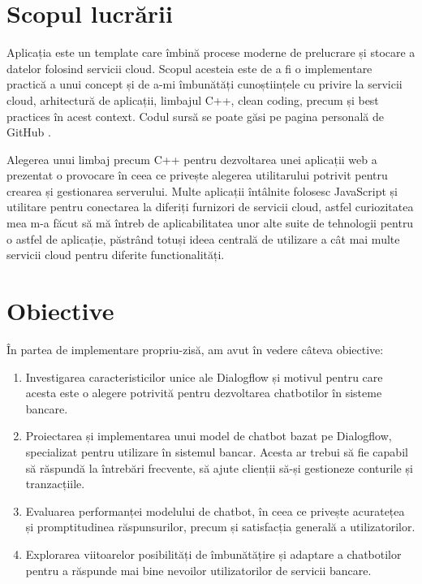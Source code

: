 \section{Scopul lucrării}

Aplicația este un template care îmbină procese moderne de prelucrare și stocare a datelor folosind servicii cloud. Scopul acesteia este de a fi o implementare practică a unui concept și de a-mi îmbunătăți cunoștiințele cu privire la servicii cloud, arhitectură de aplicații, limbajul C++, clean coding, precum și best practices în acest context. Codul sursă se poate găsi pe pagina personală de GitHub \cite{github}.

Alegerea unui limbaj precum C++ pentru dezvoltarea unei aplicații web a prezentat o provocare în ceea ce privește alegerea utilitarului potrivit pentru crearea și gestionarea serverului. Multe aplicații întâlnite folosesc JavaScript și utilitare pentru conectarea la diferiți furnizori de servicii cloud, astfel curiozitatea mea m-a făcut să mă întreb de aplicabilitatea unor alte suite de tehnologii pentru o astfel de aplicație, păstrând totuși ideea centrală de utilizare a cât mai multe servicii cloud pentru diferite functionalități.

\section{Obiective}

În partea de implementare propriu-zisă, am avut în vedere câteva obiective:

\begin{enumerate}
    \item Investigarea caracteristicilor unice ale Dialogflow și motivul pentru care acesta este o alegere potrivită pentru dezvoltarea chatbotilor în sisteme bancare.
    \item Proiectarea și implementarea unui model de chatbot bazat pe Dialogflow, specializat pentru utilizare în sistemul bancar. Acesta ar trebui să fie capabil să răspundă la întrebări frecvente, să ajute clienții să-și gestioneze conturile și tranzacțiile.
    \item Evaluarea performanței modelului de chatbot, în ceea ce privește acuratețea și promptitudinea răspunsurilor, precum și satisfacția generală a utilizatorilor.
    \item Explorarea viitoarelor posibilități de îmbunătățire și adaptare a chatbotilor pentru a răspunde mai bine nevoilor utilizatorilor de servicii bancare.
\end{enumerate}

